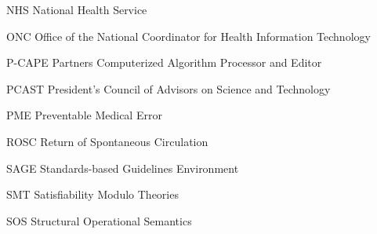 \documentclass{uiucthesis2021}
\newcounter{counterforappendices}
\begin{document}
\begin{abbrevlist}
\item[NHS]      National Health Service
\item[ONC]      Office of the National Coordinator for Health Information Technology
\item[P-CAPE]   Partners Computerized Algorithm Processor and Editor
\item[PCAST]    President's Council of Advisors on Science and Technology
\item[PME]      Preventable Medical Error
\item[ROSC]     Return of Spontaneous Circulation
\item[SAGE]     Standards-based Guidelines Environment
\item[SMT]      Satisfiability Modulo Theories
\item[SOS]      Structural Operational Semantics
\end{abbrevlist}

%

\mainmatter














\backmatter

\printbibliography[heading=bibintoc,title={References}]

\clearpage
\setcounter{counterforappendices}{\value{page}}
\mainmatter
\setcounter{page}{\value{counterforappendices}}




% 
\end{document}

